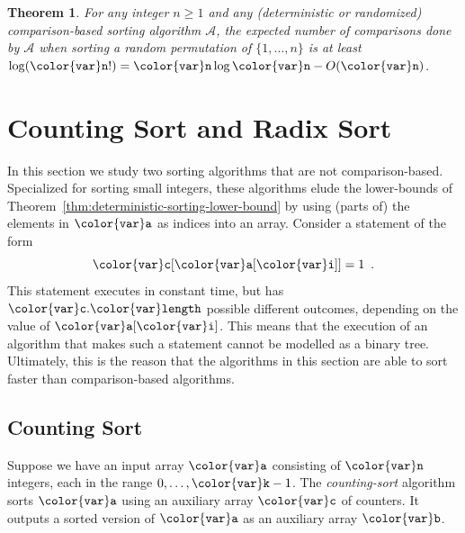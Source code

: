 \documentclass[10pt]{book}
\theoremstyle{plain}
\newtheorem{thm}{Theorem}[chapter]
\newcommand{\thmlabel}[1]{\label{thm:#1}}
\newcommand{\thmref}[1]{Theorem~\ref{thm:#1}}
\theoremstyle{definition}
\begin{document}
\begin{thm}\thmlabel{randomized-sorting-lower-bound}
  For any integer $n\ge 1$ and any  (deterministic or randomized)
  comparison-based sorting algorithm $\mathcal{A}$, the expected number
  of comparisons done by $\mathcal{A}$ when sorting a random permutation
  of $\{1,\ldots,n\}$ is at least $\log(\ensuremath{\mathtt{{\color{var}n}}}!) = \ensuremath{\mathtt{{\color{var}n}}}\log\ensuremath{\mathtt{{\color{var}n}}}-O(\ensuremath{\mathtt{{\color{var}n}}})$.
\end{thm}



\section{Counting Sort and Radix Sort}

In this section we study two sorting algorithms that are not
comparison-based. Specialized for sorting small integers, these algorithms
elude the lower-bounds of \thmref{deterministic-sorting-lower-bound}
by using (parts of) the elements in \ensuremath{\mathtt{{\color{var}a}}} as indices into an array.
Consider a statement of the form
\[
  \ensuremath{\mathtt{{\color{var}c}[{\color{var}a}[{\color{var}i}]]}} = 1 \enspace .
\]
This statement executes in constant time, but has \ensuremath{\mathtt{{\color{var}c}.{\color{var}length}}} possible
different outcomes, depending on the value of \ensuremath{\mathtt{{\color{var}a}[{\color{var}i}]}}.  This means that the
execution of an algorithm that makes such a statement cannot be modelled
as a binary tree.  Ultimately, this is the reason that the algorithms
in this section are able to sort faster than comparison-based algorithms.

\subsection{Counting Sort}

Suppose we have an input array \ensuremath{\mathtt{{\color{var}a}}} consisting of \ensuremath{\mathtt{{\color{var}n}}} integers, each in
the range $0,\ldots,\ensuremath{\mathtt{{\color{var}k}}}-1$.  The \emph{counting-sort}
%
algorithm sorts \ensuremath{\mathtt{{\color{var}a}}}
using an auxiliary array \ensuremath{\mathtt{{\color{var}c}}} of counters.  It outputs a sorted version
of \ensuremath{\mathtt{{\color{var}a}}} as an auxiliary array \ensuremath{\mathtt{{\color{var}b}}}.
\end{document}
